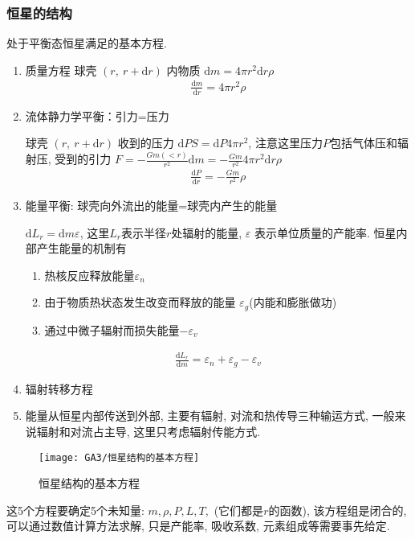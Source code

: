 \subsubsection{恒星的结构}
处于平衡态恒星满足的基本方程. 
\begin{enumerate}
    \item 质量方程
    球壳 $(r,\ r+\mathrm{d}r)$ 内物质 $\mathrm{d}m=4\pi r^2 \mathrm{d}r \rho$
    \begin{align*}
        \frac{\mathrm{d} m}{\mathrm{d} r}=4\pi r^2 \rho
    \end{align*}
    \item 流体静力学平衡：引力=压力
    
    球壳 $(r,\ r+\mathrm{d}r)$ 收到的压力 $\mathrm{d}P S=\mathrm{d}P 4\pi r^2$, 注意这里压力$P$包括气体压和辐射压, 受到的引力 $F=-\frac{G m(<r)}{r^2}\mathrm{d}m=-\frac{G m}{r^2} 4\pi r^2 \mathrm{d}r \rho$
    \begin{align*}
        \frac{\mathrm{d}P}{\mathrm{d}r}=-\frac{Gm}{r^2}\rho
    \end{align*}
    \item 能量平衡: 球壳向外流出的能量=球壳内产生的能量
    
    $\mathrm{d}L_r =\mathrm{d}m \varepsilon$, 这里$L_r$表示半径$r$处辐射的能量,  $\varepsilon$ 表示单位质量的产能率. 恒星内部产生能量的机制有
    \begin{enumerate}
        \item 热核反应释放能量$\varepsilon_n$
        \item 由于物质热状态发生改变而释放的能量 $\varepsilon_g$(内能和膨胀做功)
        \item 通过中微子辐射而损失能量$-\varepsilon_v$
    \end{enumerate}
    \begin{align*}
        \frac{\mathrm{d}L_r}{\mathrm{d}m}=\varepsilon_n+\varepsilon_g-\varepsilon_v
    \end{align*}
    \item 辐射转移方程
    \item 
    能量从恒星内部传送到外部, 主要有辐射, 对流和热传导三种输运方式, 一般来说辐射和对流占主导, 这里只考虑辐射传能方式. 
\end{enumerate}

\begin{figure}[!htb]
    \centering
    \texttt{[image: GA3/恒星结构的基本方程]}
    \caption{恒星结构的基本方程}
\end{figure}
这5个方程要确定5个未知量: $m, \rho, P, L, T,$ (它们都是$r$的函数), 该方程组是闭合的, 可以通过数值计算方法求解, 只是产能率, 吸收系数, 元素组成等需要事先给定. 

